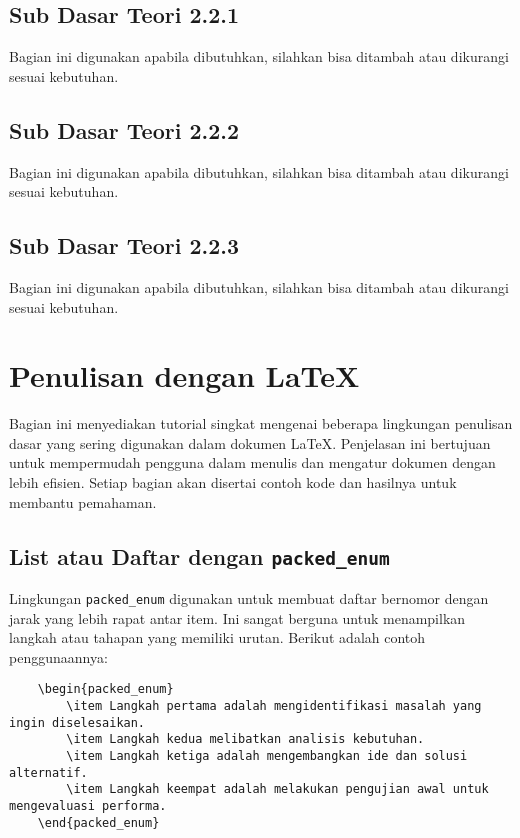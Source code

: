 \subsection{Sub Dasar Teori 2.2.1}
Bagian ini digunakan apabila dibutuhkan, silahkan bisa ditambah atau dikurangi sesuai kebutuhan.

\subsection{Sub Dasar Teori 2.2.2}
Bagian ini digunakan apabila dibutuhkan, silahkan bisa ditambah atau dikurangi sesuai kebutuhan.

\subsection{Sub Dasar Teori 2.2.3}
Bagian ini digunakan apabila dibutuhkan, silahkan bisa ditambah atau dikurangi sesuai kebutuhan.

\section{Penulisan dengan \LaTeX}
Bagian ini menyediakan tutorial singkat mengenai beberapa lingkungan penulisan dasar yang sering digunakan dalam dokumen LaTeX. Penjelasan ini bertujuan untuk mempermudah pengguna dalam menulis dan mengatur dokumen dengan lebih efisien. Setiap bagian akan disertai contoh kode dan hasilnya untuk membantu pemahaman.

\subsection{List atau Daftar dengan \texttt{packed\_enum}}
Lingkungan \texttt{packed\_enum} digunakan untuk membuat daftar bernomor dengan jarak yang lebih rapat antar item. Ini sangat berguna untuk menampilkan langkah atau tahapan yang memiliki urutan. Berikut adalah contoh penggunaannya:

\begin{lstlisting}
    \begin{packed_enum}
        \item Langkah pertama adalah mengidentifikasi masalah yang ingin diselesaikan.
        \item Langkah kedua melibatkan analisis kebutuhan.
        \item Langkah ketiga adalah mengembangkan ide dan solusi alternatif.
        \item Langkah keempat adalah melakukan pengujian awal untuk mengevaluasi performa.
    \end{packed_enum}
\end{lstlisting}
    
